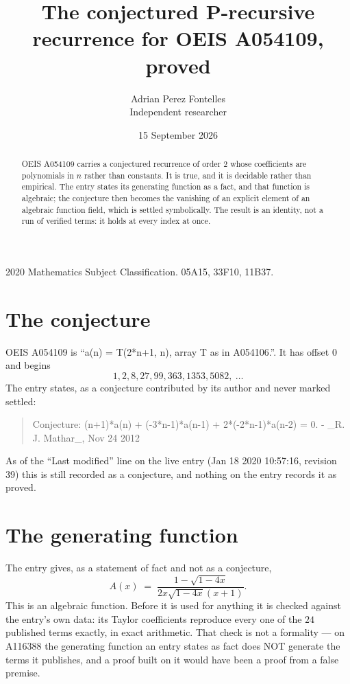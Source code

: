 \documentclass[11pt,a4paper]{article}
\title{The conjectured P-recursive recurrence for OEIS A054109, proved}
\author{Adrian Perez Fontelles\\ \small Independent researcher}
\date{15 September 2026}
\theoremstyle{plain}
\theoremstyle{definition}
\begin{document}
\maketitle

\begin{abstract}
OEIS A054109 carries a conjectured recurrence of order $2$ whose coefficients are polynomials in
$n$ rather than constants. It is true, and it is decidable rather than empirical. The entry
states its generating function as a fact, and that function is algebraic; the conjecture then
becomes the vanishing of an explicit element of an algebraic function field, which is settled
symbolically. The result is an identity, not a run of verified terms: it holds at every index
at once.
\end{abstract}

\noindent\small 2020 Mathematics Subject Classification. 05A15, 33F10, 11B37.\normalsize

\section{The conjecture}

OEIS A054109 is ``a(n) = T(2*n+1, n), array T as in A054106.''. It has offset $0$ and begins
\[
1, 2, 8, 27, 99, 363, 1353, 5082,\ \dots
\]
The entry states, as a conjecture contributed by its author and never marked settled:
\begin{quote}\raggedright\small
Conjecture: (n+1)*a(n) + (-3*n-1)*a(n-1) + 2*(-2*n-1)*a(n-2) = 0. - \_R. J. Mathar\_, Nov 24 2012
\end{quote}
As of the ``Last modified'' line on the live entry (Jan 18 2020 10:57:16, revision 39)
this is still recorded as a conjecture, and nothing on the entry records it as proved.

\section{The generating function}

The entry gives, as a statement of fact and not as a conjecture,
\[
A(x)\;=\;\frac{1 - \sqrt{1 - 4 x}}{2 x \sqrt{1 - 4 x} \left(x + 1\right)} .
\]
This is an algebraic function. Before it is used for anything it is checked against the entry's
own data: its Taylor coefficients reproduce every one of the $24$ published terms
exactly, in exact arithmetic. That check is not a formality --- on A116388 the generating
function an entry states as fact does NOT generate the terms it publishes, and a proof built on
it would have been a proof from a false premise.
\end{document}
